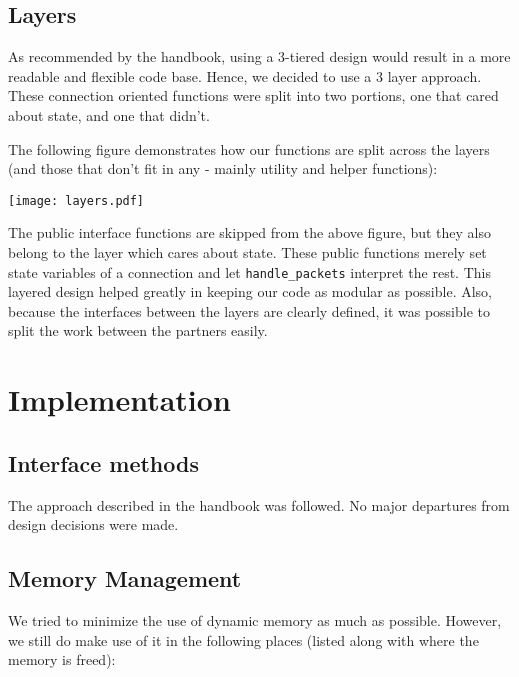 \documentclass{article}
\begin{document}
\subsection{Layers}
As recommended by the handbook, using a 3-tiered design would result in a more readable and flexible code base. Hence, we decided to use a 3 layer approach. These connection oriented functions were split into two portions, one that cared about state, and one that didn't.

The following figure demonstrates how our functions are split across the layers (and those that don't fit in any - mainly utility and helper functions):

\texttt{[image: layers.pdf]}

The public interface functions are skipped from the above figure, but they also belong to the layer which cares about state. These public functions merely set state variables of a connection and let \texttt{handle\_packets} interpret the rest. This layered design helped greatly in keeping our code as modular as possible. Also, because the interfaces between the layers are clearly defined, it was possible to split the work between the partners easily.
\section{Implementation}

\subsection{Interface methods}
The approach described in the handbook was followed. No major departures from design decisions were made.

\subsection{Memory Management}
We tried to minimize the use of dynamic memory as much as possible. However, we still do make use of it in the following places (listed along with where the memory is freed):
\end{document}
